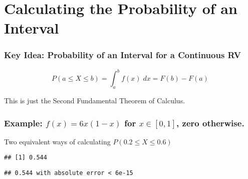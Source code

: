 \section{Calculating the Probability of an Interval}
\begin{frame}
\frametitle{Key Idea: Probability of an Interval for a Continuous RV}

$$\boxed{P(a\leq X \leq b) = \int_a^b f(x) \; dx = F(b) - F(a)}$$

\vspace{2em}
\alert{This is just the Second Fundamental Theorem of Calculus.}
\end{frame}
\begin{frame}[fragile]
  \frametitle{Example: $f(x) = 6x(1-x)$ for $x \in [0,1]$, zero otherwise.}

  Two equivalent ways of calculating $P(0.2 \leq X \leq 0.6)$

\begin{knitrout}
\color{fgcolor}\begin{kframe}
\begin{alltt}
 \hlkwb{<-} \hlstd{(}\hlstd{) \{}
   \hlopt{*} \hlopt{^} \hlopt{-}  \hlopt{*} \hlopt{^}
\hlstd{\}}
\hlstd{(}\hlstd{)} \hlopt{-} \hlstd{(}\hlstd{)}
\end{alltt}
\begin{verbatim}
## [1] 0.544
\end{verbatim}
\begin{alltt}
  \hlstd{=} \hlstd{,}  \hlstd{=} \hlstd{)}
\end{alltt}
\begin{verbatim}
## 0.544 with absolute error < 6e-15
\end{verbatim}
\end{kframe}
\end{knitrout}

\end{frame}
